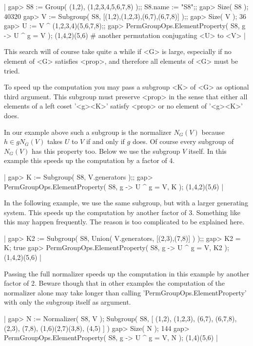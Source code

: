|    gap> S8 := Group( (1,2), (1,2,3,4,5,6,7,8) );;  S8.name := "S8";;
    gap> Size( S8 );
    40320
    gap> V := Subgroup( S8, [(1,2),(1,2,3),(6,7),(6,7,8)] );;
    gap> Size( V );
    36
    gap> U := V ^ (1,2,3,4)(5,6,7,8);;
    gap> PermGroupOps.ElementProperty( S8, g -> U ^ g = V );
    (1,4,2)(5,6)    # another permutation conjugating <U> to <V> |

This search will of course take quite a while if <G> is large, especially
if no element of <G>  satisfies <prop>, and therefore all elements of <G>
must be tried.

To  speed  up  the computation you  may  pass a subgroup  <K> of  <G>  as
optional third argument.  This subgroup must preserve <prop> in the sense
that either all  elements of a left coset '<g>\*<K>' satisfy <prop> or no
element of '<g>\*<K>' does.

In our example above such a  subgroup is the normalizer $N_G(V)$  because
$h \in g N_G(V)$ takes $U$  to $V$ if and only if  $g$  does.  Of  course
every subgroup of  $N_G(V)$ has  this  property too.   Below we  use  the
subgroup $V$ itself.  In this example this speeds up the computation by a
factor of 4.

|    gap> K := Subgroup( S8, V.generators );;
    gap> PermGroupOps.ElementProperty( S8, g -> U ^ g = V, K );
    (1,4,2)(5,6) |

In the following example,  we use  the same  subgroup, but  with a larger
generating system.   This  speeds up the computation by another factor of
3.   Something  like this  may  happen  frequently.   The  reason  is too
complicated to be explained here.

|    gap> K2 := Subgroup( S8, Union( V.generators, [(2,3),(7,8)] ) );;
    gap> K2 = K;
    true
    gap> PermGroupOps.ElementProperty( S8, g -> U ^ g = V, K2 );
    (1,4,2)(5,6) |

Passing the full normalizer speeds up  the computation in this example by
another  factor  of  2.   Beware   though  that  in  other  examples  the
computation  of  the  normalizer  alone  may  take  longer  than  calling
'PermGroupOps.ElementProperty' with only the subgroup itself as argument.

|    gap> N := Normalizer( S8, V );
    Subgroup( S8, [ (1,2), (1,2,3), (6,7), (6,7,8), (2,3), (7,8),
      (1,6)(2,7)(3,8), (4,5) ] )
    gap> Size( N );
    144
    gap> PermGroupOps.ElementProperty( S8, g -> U ^ g = V, N );
    (1,4)(5,6) |


